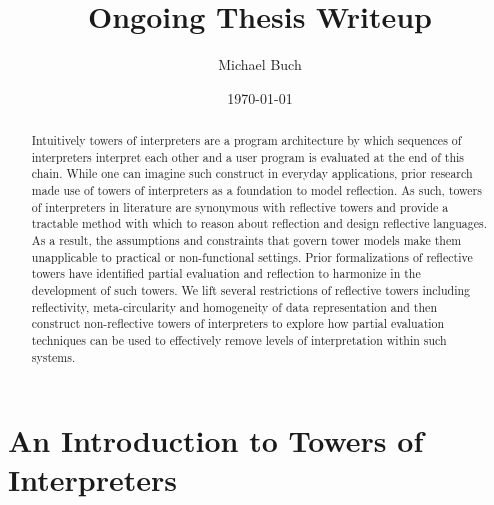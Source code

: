 \documentclass{article}
\title{Ongoing Thesis Writeup}
\author{Michael Buch}
\date{\today}
\theoremstyle{definition}
\begin{document}
\maketitle
\frenchspacing

\begin{abstract}
Intuitively towers of interpreters are a program architecture by which sequences of interpreters interpret each other and a user program is evaluated at the end of this chain. While one can imagine such
construct in everyday applications, prior research made use of towers of interpreters as a foundation to model reflection. As such, towers of interpreters in literature are synonymous with reflective towers and provide a tractable method with which to reason about reflection and design reflective languages. As a result, the assumptions and constraints that govern tower models make them unapplicable to practical or non-functional
settings. Prior formalizations of reflective towers have identified partial evaluation and reflection to harmonize in the development of such towers. We lift several restrictions of reflective towers including reflectivity, meta-circularity and homogeneity of data representation and then construct non-reflective towers
of interpreters to explore how partial evaluation techniques can be used to effectively remove levels of interpretation within such systems. %
\end{abstract}

\newcommand{\mslang}{$\lambda\uparrow\downarrow$}
\newcommand{\mslangStar}{$\lambda\uparrow\downarrow^*$}

\section{An Introduction to Towers of Interpreters}
\end{document}

